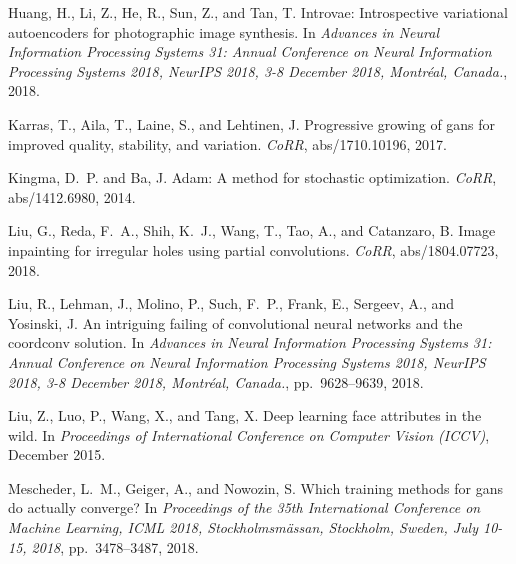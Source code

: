 \documentclass{article}
\begin{document}
\begin{multicols}{2}
{\begin{thebibliography}{36}
Huang, H., Li, Z., He, R., Sun, Z., and Tan, T.
\newblock Introvae: Introspective variational autoencoders for photographic
  image synthesis.
\newblock In \emph{Advances in Neural Information Processing Systems 31: Annual
  Conference on Neural Information Processing Systems 2018, NeurIPS 2018, 3-8
  December 2018, Montr{\'{e}}al, Canada.}, 2018.

Karras, T., Aila, T., Laine, S., and Lehtinen, J.
\newblock Progressive growing of gans for improved quality, stability, and
  variation.
\newblock \emph{CoRR}, abs/1710.10196, 2017.

Kingma, D.~P. and Ba, J.
\newblock Adam: {A} method for stochastic optimization.
\newblock \emph{CoRR}, abs/1412.6980, 2014.

Liu, G., Reda, F.~A., Shih, K.~J., Wang, T., Tao, A., and Catanzaro, B.
\newblock Image inpainting for irregular holes using partial convolutions.
\newblock \emph{CoRR}, abs/1804.07723, 2018{}.

Liu, R., Lehman, J., Molino, P., Such, F.~P., Frank, E., Sergeev, A., and
  Yosinski, J.
\newblock An intriguing failing of convolutional neural networks and the
  coordconv solution.
\newblock In \emph{Advances in Neural Information Processing Systems 31: Annual
  Conference on Neural Information Processing Systems 2018, NeurIPS 2018, 3-8
  December 2018, Montr{\'{e}}al, Canada.}, pp.\  9628--9639,
  2018{}.

Liu, Z., Luo, P., Wang, X., and Tang, X.
\newblock Deep learning face attributes in the wild.
\newblock In \emph{Proceedings of International Conference on Computer Vision
  (ICCV)}, December 2015.

Mescheder, L.~M., Geiger, A., and Nowozin, S.
\newblock Which training methods for gans do actually converge?
\newblock In \emph{Proceedings of the 35th International Conference on Machine
  Learning, {ICML} 2018, Stockholmsm{\"{a}}ssan, Stockholm, Sweden, July 10-15,
  2018}, pp.\  3478--3487, 2018.


\end{thebibliography}}
\end{multicols}
\end{document}
